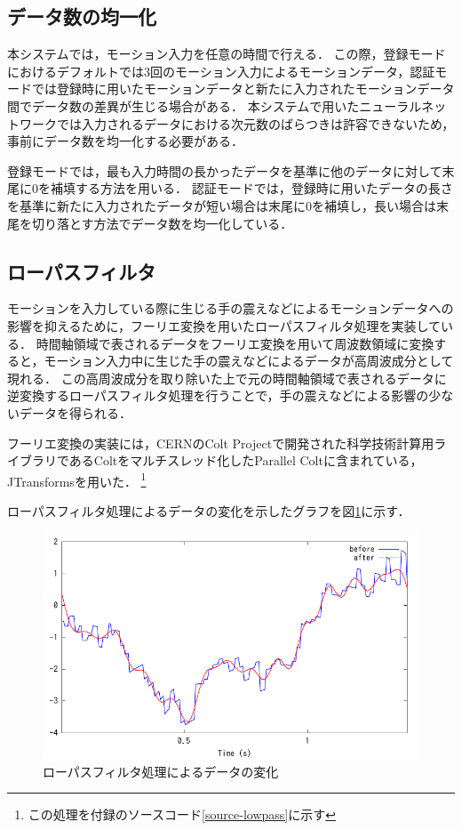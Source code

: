 \subsection{データ数の均一化}
本システムでは，モーション入力を任意の時間で行える．
この際，登録モードにおけるデフォルトでは3回のモーション入力によるモーションデータ，認証モードでは登録時に用いたモーションデータと新たに入力されたモーションデータ間でデータ数の差異が生じる場合がある．
本システムで用いたニューラルネットワークでは入力されるデータにおける次元数のばらつきは許容できないため，事前にデータ数を均一化する必要がある．

登録モードでは，最も入力時間の長かったデータを基準に他のデータに対して末尾に0を補填する方法を用いる．
認証モードでは，登録時に用いたデータの長さを基準に新たに入力されたデータが短い場合は末尾に0を補填し，長い場合は末尾を切り落とす方法でデータ数を均一化している．

\subsection{ローパスフィルタ}
モーションを入力している際に生じる手の震えなどによるモーションデータへの影響を抑えるために，フーリエ変換を用いたローパスフィルタ処理を実装している．
時間軸領域で表されるデータをフーリエ変換を用いて周波数領域に変換すると，モーション入力中に生じた手の震えなどによるデータが高周波成分として現れる．
この高周波成分を取り除いた上で元の時間軸領域で表されるデータに逆変換するローパスフィルタ処理を行うことで，手の震えなどによる影響の少ないデータを得られる．

フーリエ変換の実装には，CERNのColt Project\cite{4-colt-project}で開発された科学技術計算用ライブラリであるColtをマルチスレッド化したParallel Colt\cite{4-parallel-colt}に含まれている，JTransforms\cite{4-jtransforms}を用いた．
\footnote{この処理を付録のソースコード\ref{source-lowpass}に示す}

ローパスフィルタ処理によるデータの変化を示したグラフを図\ref{graph-lowpass}に示す．

\begin{figure}[bthp]
  \centering
  \includegraphics[bb=0 0 360 216, width=12cm]{Graphs/lowpass.pdf}
  \caption{ローパスフィルタ処理によるデータの変化}
  \label{graph-lowpass}
\end{figure}


